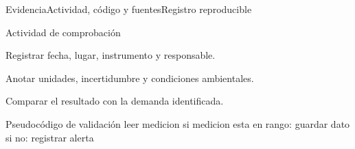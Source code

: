 \documentclass{hvtbook}
\begin{document}
\begin{HVTPage}{Evidencia}{Actividad, código y fuentes}{Registro reproducible}

\begin{HVTTask}{Actividad de comprobación}
  \item Registrar fecha, lugar, instrumento y responsable.
  \item Anotar unidades, incertidumbre y condiciones ambientales.
  \item Comparar el resultado con la demanda identificada.
\end{HVTTask}

\begin{HVTCode}{Pseudocódigo de validación}
leer medicion
si medicion esta en rango:
    guardar dato
si no:
    registrar alerta
\end{HVTCode}

\begin{HVTReferences}
\end{HVTReferences}

\end{HVTPage}
\end{document}

